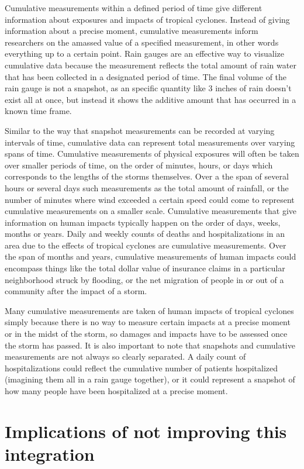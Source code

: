 \documentclass[
]{article}
\begin{document}
Cumulative measurements within a defined period of time give different
information about exposures and impacts of tropical cyclones. Instead of
giving information about a precise moment, cumulative measurements
inform researchers on the amassed value of a specified measurement, in
other words everything up to a certain point. Rain gauges are an
effective way to visualize cumulative data because the measurement
reflects the total amount of rain water that has been collected in a
designated period of time. The final volume of the rain gauge is not a
snapshot, as an specific quantity like 3 inches of rain doesn't exist
all at once, but instead it shows the additive amount that has occurred
in a known time frame.

Similar to the way that snapshot measurements can be recorded at varying
intervals of time, cumulative data can represent total measurements over
varying spans of time. Cumulative measurements of physical exposures
will often be taken over smaller periods of time, on the order of
minutes, hours, or days which corresponds to the lengths of the storms
themselves. Over a the span of several hours or several days such
measurements as the total amount of rainfall, or the number of minutes
where wind exceeded a certain speed could come to represent cumulative
measurements on a smaller scale. Cumulative measurements that give
information on human impacts typically happen on the order of days,
weeks, months or years. Daily and weekly counts of deaths and
hospitalizations in an area due to the effects of tropical cyclones are
cumulative measurements. Over the span of months and years, cumulative
measurements of human impacts could encompass things like the total
dollar value of insurance claims in a particular neighborhood struck by
flooding, or the net migration of people in or out of a community after
the impact of a storm.

Many cumulative measurements are taken of human impacts of tropical
cyclones simply because there is no way to measure certain impacts at a
precise moment or in the midst of the storm, so damages and impacts have
to be assessed once the storm has passed. It is also important to note
that snapshots and cumulative measurements are not always so clearly
separated. A daily count of hospitalizations could reflect the
cumulative number of patients hospitalized (imagining them all in a rain
gauge together), or it could represent a snapshot of how many people
have been hospitalized at a precise moment.

\hypertarget{implications-of-not-improving-this-integration}{%
\section{Implications of not improving this
integration}\label{implications-of-not-improving-this-integration}}
\end{document}
